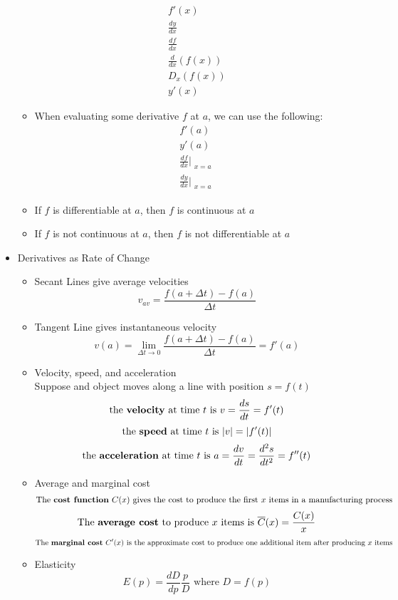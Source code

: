 \documentclass{article}
\begin{document}
\begin{itemize}
\begin{itemize}
        \begin{eqnarray}
            f'(x) \\
            \frac{dy}{dx} \\
            \frac{df}{dx} \\
            \frac{d}{dx}(f(x)) \\
            D_x (f(x)) \\
            y'(x)
        \end{eqnarray}
        \item When evaluating some derivative $f$ at $a$, we can use the following:
        \begin{eqnarray}
            f'(a) \\
            y'(a) \\
            \frac{df}{dx}\Bigr|_{\substack{x=a}} \\
            \frac{dy}{dx}\Bigr|_{\substack{x=a}}
        \end{eqnarray}
        \item If $f$ is differentiable at $a$, then $f$ is continuous at $a$
        \item If $f$ is not continuous at $a$, then $f$ is not differentiable at $a$
    \end{itemize}
    \item Derivatives as Rate of Change
    \begin{itemize}
        \item Secant Lines give average velocities
        $$v_{av} = \frac{f(a + \Delta t) - f(a)}{\Delta t}$$
        \item Tangent Line gives instantaneous velocity
        $$v(a) = \lim_{\Delta t \to 0}{\frac{f(a + \Delta t) - f(a)}{\Delta t}} = f'(a)$$
        \item Velocity, speed, and acceleration
        \\ Suppose and object moves along a line with position $s = f(t)$
        $$\text{the \textbf{velocity} at time } t \text{ is } v = \frac{ds}{dt} = f'(t)$$
        $$\text{the \textbf{speed} at time } t \text{ is } |v| = |f'(t)|$$
        $$\text{the \textbf{acceleration} at time } t \text{ is } a = \frac{dv}{dt} = \frac{d^2s}{dt^2} = f''(t)$$
        \item Average and marginal cost
        $$\text{The \textbf{cost function} } C(x) \text{ gives the cost to produce the first } x \text{ items in a manufacturing process}$$
        $$\text{The \textbf{average cost} to produce } x \text{ items is } \overline{C}(x) = \frac{C(x)}{x}$$
        $$\text{The \textbf{marginal cost} } C'(x) \text{ is the approximate cost to produce one additional item after producing } x \text{ items}$$
        \item Elasticity
        $$E(p) = \frac{dD}{dp}\frac{p}{D} \text{ where } D = f(p)$$
    \end{itemize}
\end{itemize}
\end{document}
